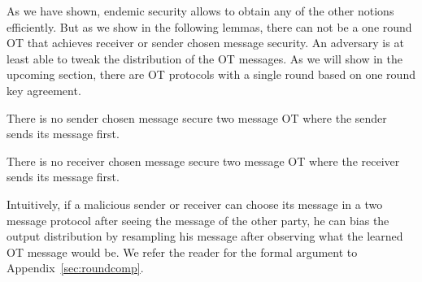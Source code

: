 As we have shown, endemic security allows to obtain any of the other notions efficiently. But as we show in the following lemmas, there can not be a one round OT that achieves receiver or sender chosen message security. An adversary is at least able to tweak the distribution of the OT messages. As we will show in the upcoming section, there are OT protocols with a single round based on one round key agreement.

\begin{lemma}\label{lem:nosendtweak}
There is no sender chosen message secure two message OT where the sender sends its message first. 
\end{lemma}


\begin{lemma}\label{lem:norectweak}
There is no receiver chosen message secure two message OT where the receiver sends its message first.
\end{lemma}

Intuitively, if a malicious sender or receiver can choose its message in a two message protocol after seeing the message of the other party, he can bias the output distribution by resampling his message after observing what the learned OT message would be. We refer the reader for the formal argument to 
Appendix~\ref{sec:roundcomp}.